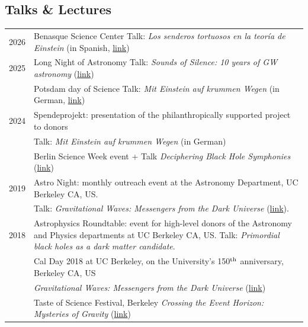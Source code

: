 \documentclass[11pt,a4paper]{article}
\begin{document}
\subsection*{Talks \& Lectures}
\vspace{-.3cm}
\begin{longtable}{c p{15cm}}
2026 & {Benasque Science Center} Talk: \textit{Los senderos tortuosos en la teoría de Einstein} (in Spanish, \href{https://campushuesca.unizar.es/noticia/charla-senderos-tortuosos-en-las-teorias-de-einstein}{link}) \\[2pt]
2025 & {Long Night of Astronomy} Talk: \textit{Sounds of Silence: 10 years of GW astronomy} (\href{https://www.aei.mpg.de/1280508/10-years-of-gravitational-wave-astronomy}{link}) \\[2pt]
& {Potsdam day of Science} Talk: \textit{Mit Einstein auf krummen Wegen} (in German, \href{http://ptdw.de/1037}{link}) \\[2pt]
2024 & {Spendeprojekt}: presentation of the philanthropically supported project to donors \\
& Talk: \textit{Mit Einstein auf krummen Wegen} (in German) \\[2pt]
& Berlin Science Week event + Talk \textit{Deciphering Black Hole Symphonies} (\href{https://berlinscienceweek.com/programme/deciphering-black-hole-symphonies-new-world-gravitational-wave-astronomy}{link})
\\[2pt]
 2019 & {Astro Night}: monthly outreach event at the Astronomy Department, {UC Berkeley} CA, US. \\ & Talk: \textit{Gravitational Waves: Messengers from the Dark Universe} (\href{https://astro.berkeley.edu/astro-night}{link}).
\\[2pt]
 2018 & {Astrophysics Roundtable}: event for high-level donors of the Astronomy and Physics departments at {UC Berkeley} CA, US. Talk: \textit{Primordial black holes as a dark matter candidate}. %
\\[2pt]
 & {Cal Day 2018} at {UC Berkeley}, on the University's 150$^{\rm th}$ anniversary, Berkeley CA, US 
 \\ & \textit{Gravitational Waves: Messengers from the Dark Universe} (\href{http://calday.berkeley.edu/detail.php?eventID=5011}{link})
\\[2pt]
& {Taste of Science Festival}, Berkeley %
\textit{Crossing the Event Horizon:
Mysteries of Gravity} (\href{https://tasteofscience.org/san-francisco-events/2018/4/24/going-down-diving-into-gravity-and-the-deep-blue-sea}{link})
\end{longtable}
\end{document}
